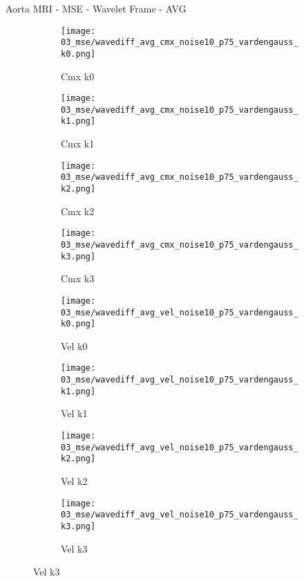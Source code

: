 \documentclass{beamer}
\begin{document}
\begin{frame}{Aorta MRI - MSE - Wavelet Frame - AVG}{}
\begin{figure}
\begin{subfigure}{0.24\textwidth}
\texttt{[image: 03\_mse/wavediff\_avg\_cmx\_noise10\_p75\_vardengauss\_k0.png]}
\vspace{-20pt}
\caption*{\tiny Cmx k0}
\end{subfigure}
\begin{subfigure}{0.24\textwidth}
\texttt{[image: 03\_mse/wavediff\_avg\_cmx\_noise10\_p75\_vardengauss\_k1.png]}
\vspace{-20pt}
\caption*{\tiny Cmx k1}
\end{subfigure}
\begin{subfigure}{0.24\textwidth}
\texttt{[image: 03\_mse/wavediff\_avg\_cmx\_noise10\_p75\_vardengauss\_k2.png]}
\vspace{-20pt}
\caption*{\tiny Cmx k2}
\end{subfigure}
\begin{subfigure}{0.24\textwidth}
\texttt{[image: 03\_mse/wavediff\_avg\_cmx\_noise10\_p75\_vardengauss\_k3.png]}
\vspace{-20pt}
\caption*{\tiny Cmx k3}
\end{subfigure}

\begin{subfigure}{0.24\textwidth}
\texttt{[image: 03\_mse/wavediff\_avg\_vel\_noise10\_p75\_vardengauss\_k0.png]}
\vspace{-20pt}
\caption*{\tiny Vel k0}
\end{subfigure}
\begin{subfigure}{0.24\textwidth}
\texttt{[image: 03\_mse/wavediff\_avg\_vel\_noise10\_p75\_vardengauss\_k1.png]}
\vspace{-20pt}
\caption*{\tiny Vel k1}
\end{subfigure}
\begin{subfigure}{0.24\textwidth}
\texttt{[image: 03\_mse/wavediff\_avg\_vel\_noise10\_p75\_vardengauss\_k2.png]}
\vspace{-20pt}
\caption*{\tiny Vel k2}
\end{subfigure}
\begin{subfigure}{0.24\textwidth}
\texttt{[image: 03\_mse/wavediff\_avg\_vel\_noise10\_p75\_vardengauss\_k3.png]}
\vspace{-20pt}
\caption*{\tiny Vel k3}
\end{subfigure}
\end{figure}
\end{frame}
\end{document}
